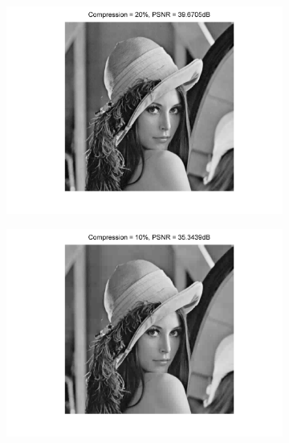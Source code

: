 \documentclass[11pt]{article}
\begin{document}
\begin{figure}[H]
	\centering
	\begin{subfigure}{0.4\textwidth}
	  	\centering
		\includegraphics[trim=0.5in 0.3in 0.5in 0in, width=\textwidth]{Fig_Lena_Compr_20.png}        
		\caption{}
	    \label{Fig_Lena_Compr_20}	    
    \end{subfigure}
	\begin{subfigure}{0.4\textwidth}
        \centering
		\includegraphics[trim=0.5in 0.3in 0.5in 0in, width=\textwidth]{Fig_Lena_Compr_10.png}
		\caption{}
		\label{Fig_Lena_Compr_10}
	\end{subfigure}
	

\end{figure}
\end{document}
